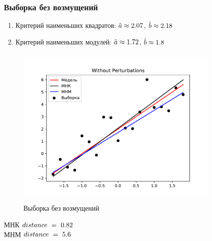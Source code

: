 \documentclass[a4paper]{article}
\begin{document}
            \subsubsection{Выборка без возмущений}
                \begin{enumerate}
                    \item{Критерий наименьших квадратов:}
                    $\hat{a}\approx 2.07$, $\hat{b}\approx 2.18$
                    \item{Критерий наименьших модулей:}
                    $\hat{a}\approx 1.72$, $\hat{b}\approx 1.8$
                \end{enumerate}
                \begin{figure}[H]
                    \centering
                    \includegraphics[width = 10cm, height = 8cm]{src_lab_6/Without Perturbations}
                    \caption{Выборка без возмущений}
                    \label{without_pert}
                \end{figure}
                МНК$~distance~=~0.82$ \\
		        МНМ$~distance~=~5.6$
\end{document}
